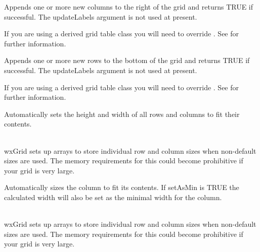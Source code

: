 
Appends one or more new columns to the right of the grid and returns TRUE if
successful. The updateLabels argument is not used at present.

If you are using a derived grid table class you will need to override 
. See 
 for further information. 

\label{wxgridappendrows}


Appends one or more new rows to the bottom of the grid and returns TRUE if
successful. The updateLabels argument is not used at present.

If you are using a derived grid table class you will need to override 
. See 
 for further information. 

\label{wxgridautosize}


Automatically sets the height and width of all rows and columns to fit their contents.

 \\
wxGrid sets up arrays to store individual row and column sizes when non-default sizes are used.
The memory requirements for this could become prohibitive if your grid is very large. 

\label{wxgridautosizecolumn}


Automatically sizes the column to fit its contents.  If setAsMin is TRUE the calculated width will
also be set as the minimal width for the column.

 \\
wxGrid sets up arrays to store individual row and column sizes when non-default sizes are used.
The memory requirements for this could become prohibitive if your grid is very large. 

\label{wxgridautosizecolumns}

